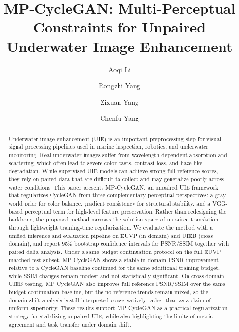 \documentclass[final,1p,times]{elsarticle}
\begin{document}
\begin{frontmatter}

\title{MP-CycleGAN: Multi-Perceptual Constraints for Unpaired Underwater Image Enhancement}

\author[aff1]{Aoqi Li}

\author[aff2]{Rongzhi Yang}

\author[aff1]{Zixuan Yang}

\author[aff1]{Chenfu Yang}



\begin{abstract}
Underwater image enhancement (UIE) is an important preprocessing step for visual signal processing pipelines used in marine inspection, robotics, and underwater monitoring. Real underwater images suffer from wavelength-dependent absorption and scattering, which often lead to severe color casts, contrast loss, and haze-like degradation. While supervised UIE models can achieve strong full-reference scores, they rely on paired data that are difficult to collect and may generalize poorly across water conditions. This paper presents MP-CycleGAN, an unpaired UIE framework that regularizes CycleGAN from three complementary perceptual perspectives: a gray-world prior for color balance, gradient consistency for structural stability, and a VGG-based perceptual term for high-level feature preservation. Rather than redesigning the backbone, the proposed method narrows the solution space of unpaired translation through lightweight training-time regularization. We evaluate the method with a unified inference and evaluation pipeline on EUVP (in-domain) and UIEB (cross-domain), and report 95\% bootstrap confidence intervals for PSNR/SSIM together with paired delta analysis. Under a same-budget continuation protocol on the full EUVP matched test subset, MP-CycleGAN shows a stable in-domain PSNR improvement relative to a CycleGAN baseline continued for the same additional training budget, while SSIM changes remain modest and not statistically significant. On cross-domain UIEB testing, MP-CycleGAN also improves full-reference PSNR/SSIM over the same-budget continuation baseline, but the no-reference trends remain mixed, so the domain-shift analysis is still interpreted conservatively rather than as a claim of uniform superiority. These results support MP-CycleGAN as a practical regularization strategy for stabilizing unpaired UIE, while also highlighting the limits of metric agreement and task transfer under domain shift.
\end{abstract}


\end{frontmatter}
\end{document}
